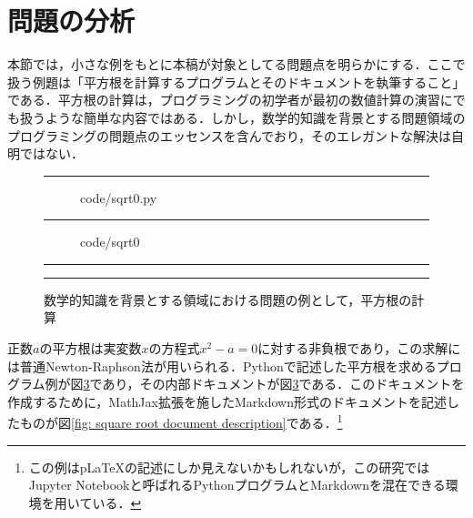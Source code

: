 \section {問題の分析}
\label {sec: problem}

本節では，小さな例をもとに本稿が対象としてる問題点を明らかにする．ここで扱う例題は「平方根を計算するプログラムとそのドキュメントを執筆すること」である．平方根の計算は，プログラミングの初学者が最初の数値計算の演習にでも扱うような簡単な内容ではある．しかし，数学的知識を背景とする問題領域のプログラミングの問題点のエッセンスを含んでおり，そのエレガントな解決は自明ではない．

\begin{figure}[tb]

  \rule {\linewidth} {1pt}
  \begin {subfigure}{.99\linewidth}
    \bgroup\small  {code/sqrt0.py}\egroup

    \label {sqrt0: code}
  \end {subfigure}

  \smallskip
  \rule {\linewidth} {.2pt}
  \smallskip

  \begin {subfigure}{.99\linewidth}
    \bgroup \color {darkblue}  {code/sqrt0} \egroup\\
    \label {sqrt0: documentation}
  \end {subfigure}

  \smallskip
  \rule {\linewidth} {.2pt}

  \caption{数学的知識を背景とする領域における問題の例として，平方根の計算}
  \label {fig: square root}
  \rule {\linewidth} {1pt}
\end{figure}

正数$a$の平方根は実変数$x$の方程式$x^2 - a = 0$に対する非負根であり，この求解には普通Newton-Raphson法が用いられる．Pythonで記述した平方根を求めるプログラム例が図\ref {fig: square root}であり，その内部ドキュメントが図\ref {fig: square root}である．このドキュメントを作成するために，MathJax拡張を施したMarkdown形式のドキュメントを記述したものが図\ref {fig: square root document description}である．\footnote {この例はpLaTeXの記述にしか見えないかもしれないが，この研究ではJupyter Notebookと呼ばれるPythonプログラムとMarkdownを混在できる環境を用いている．\cite{jupyter-2016-notebooks}}

